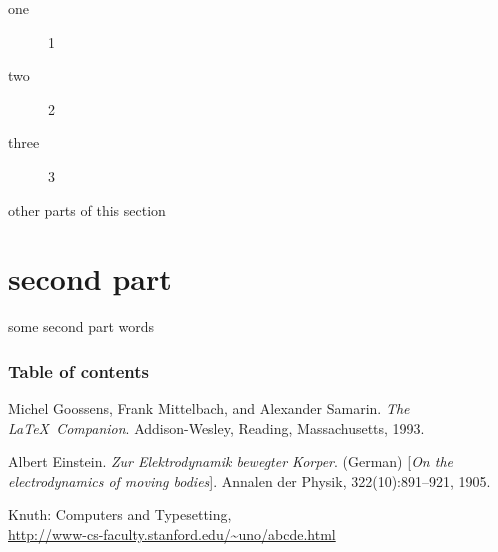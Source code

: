 \documentclass[a4paper]{book}
\begin{document}
\begin{description}
\item[one] 1
\item[two] 2 %
\item[three] 3
\end{description}

other parts of this section
\part{second part}

some second part words

\section*{Table of contents}
\tableofcontents




\begin{thebibliography}{9}
Michel Goossens, Frank Mittelbach, and Alexander Samarin. 
\textit{The \LaTeX\ Companion}. 
Addison-Wesley, Reading, Massachusetts, 1993.

Albert Einstein. 
\textit{Zur Elektrodynamik bewegter Korper}. (German) 
[\textit{On the electrodynamics of moving bodies}]. 
Annalen der Physik, 322(10):891–921, 1905.

Knuth: Computers and Typesetting,
\\ \url{http://www-cs-faculty.stanford.edu/~uno/abcde.html}
\end{thebibliography}
\end{document}
